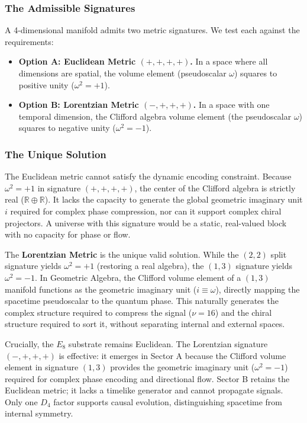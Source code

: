 \subsubsection{The Admissible Signatures}
A 4-dimensional manifold admits two metric signatures. We test each against the requirements:

\begin{itemize}
    \item \textbf{Option A: Euclidean Metric $(+,+,+,+)$.} 
    In a space where all dimensions are spatial, the volume element (pseudoscalar $\omega$) squares to positive unity ($\omega^2 = +1$). 
    \item \textbf{Option B: Lorentzian Metric $(-,+,+,+)$.} 
    In a space with one temporal dimension, the Clifford algebra volume element (the pseudoscalar $\omega$) squares to negative unity ($\omega^2 = -1$).
\end{itemize}

\subsubsection{The Unique Solution}
The Euclidean metric cannot satisfy the dynamic encoding constraint. Because $\omega^2 = +1$ in signature $(+,+,+,+)$, the center of the Clifford algebra is strictly real ($\mathbb{R} \oplus \mathbb{R}$). It lacks the capacity to generate the global geometric imaginary unit $i$ required for complex phase compression, nor can it support complex chiral projectors. A universe with this signature would be a static, real-valued block with no capacity for phase or flow.

The \textbf{Lorentzian Metric} is the unique valid solution. While the $(2,2)$ split signature yields $\omega^2 = +1$ (restoring a real algebra), the $(1,3)$ signature yields $\omega^2 = -1$. In Geometric Algebra, the Clifford volume element of a $(1,3)$ manifold functions as the geometric imaginary unit ($i \equiv \omega$), directly mapping the spacetime pseudoscalar to the quantum phase. This naturally generates the complex structure required to compress the signal ($\nu = 16$) and the chiral structure required to sort it, without separating internal and external spaces.

Crucially, the $E_8$ substrate remains Euclidean. The Lorentzian signature $(-,+,+,+)$ is effective: it emerges in Sector A because the Clifford volume element in signature $(1,3)$ provides the geometric imaginary unit ($\omega^2 = -1$) required for complex phase encoding and directional flow. Sector B retains the Euclidean metric; it lacks a timelike generator and cannot propagate signals. Only one $D_4$ factor supports causal evolution, distinguishing spacetime from internal symmetry.

